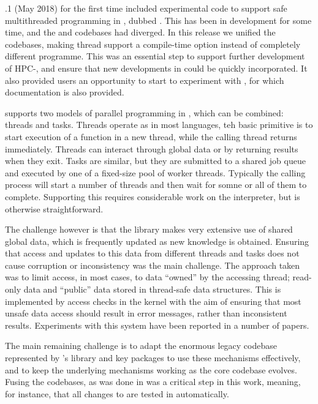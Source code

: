 \documentclass{deliverablereport}
\begin{document}
.1 (May 2018) for the first time included experimental code to 
support safe multithreaded programming in \GAP, dubbed \HPCGAP. This
has been in development for some time, and the \HPCGAP and \GAP
codebases had diverged. In this release we unified the codebases,
making thread support a compile-time option instead of completely
different programme. This was an essential step to support further development of 
HPC-\GAP, and ensure that new developments in \GAP could be quickly
incorporated.
It also provided users an opportunity to start to experiment 
with \HPCGAP, for which documentation is also provided.

\HPCGAP supports two models of parallel programming in \GAP, which can
be combined: threads and tasks. Threads operate as in most languages,
teh basic primitive is to start execution of a \GAP function in a new
thread, while the calling thread returns immediately. Threads can
interact through global data or by returning results when they exit. Tasks are
similar, but they are submitted to a shared job queue and executed by
one of a fixed-size pool of worker threads. Typically the calling
process will start a number of threads and then wait for somne or all
of them to complete.  Supporting this requires considerable work on
the \GAP interpreter, but is otherwise straightforward.

The challenge
however is that the \GAP library makes very extensive use of shared
global data, which is frequently updated as new knowledge is
obtained. Ensuring that access and updates to this data from different
threads and tasks does not cause corruption or inconsistency was the
main challenge. The approach taken was to limit access, in most cases,
to data ``owned'' by the accessing thread; read-only data and
``public'' data stored in thread-safe data structures. This is
implemented by access checks in the kernel with the aim of ensuring
that most unsafe data access should result in error messages, rather
than inconsistent results. Experiments with this system have been
reported in a number of papers.

The main remaining challenge is to adapt the enormous legacy codebase
represented by \GAP's library and key packages to use these mechanisms
effectively, and to keep the underlying mechanisms working as the core
\GAP codebase evolves. Fusing the codebases, as was done in 
was a critical step in this work, meaning, for instance, that all
changes to \GAP are tested in \HPCGAP automatically.


\end{document}
